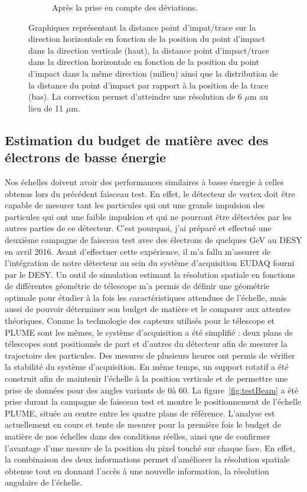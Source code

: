 \documentclass[a4papper, 10pt]{article}
\begin{document}
\begin{figure}
\begin{subfigure}[t]{0.4\textwidth}
            \caption{Après la prise en compte des déviations.}
            \label{fig:correction}
        \end{subfigure}
        \caption{Graphiques représentant la distance point d'impat/trace sur la direction horizontale en fonction de la position du point d'impact dans la direction verticale (haut), la distance point d'impact/trace dans la direction horizontale en fonction de la position du point d'impact dans la même direction (milieu) ainsi que la distribution de la distance du point d'impact par rapport à la position de la trace (bas). La correction permet d'atteindre une résolution de 6 $\mu$m au lieu de 11 $\mu$m.}
        \label{fig:defCor}
    \end{figure}    

    \subsection{Estimation du budget de matière avec des électrons de basse énergie}

  Nos échelles doivent avoir des performances similaires à basse énergie à celles obtenus lors du précédent faisceau test.
  En effet, le détecteur de vertex doit être capable de mesurer tant les particules qui ont une grande impulsion des particules qui ont une faible impulsion et qui ne pourront être détectées par les autres parties de ce détecteur.
  C'est pourquoi, j'ai préparé et effectué une deuxième campagne de faisceau test avec des électrons de quelques GeV au DESY en avril 2016.
  Avant d'effectuer cette expérience, il m'a fallu m'assurer de l'intégration de notre détecteur au sein du système d'acquisition EUDAQ fourni par le DESY. 
  Un outil de simulation estimant la résolution spatiale en fonctions de différentes géométrie de télescope m'a permis de définir une géométrie optimale pour étudier à la fois les caractéristiques attendues de l'échelle, mais aussi de pouvoir déterminer son budget de matière et le comparer aux attentes théoriques.
  Comme la technologie des capteurs utilisés pour le télescope et PLUME sont les mêmes, le système d'acquisition a été simplifié : deux plans de télescopes sont positionnés de part et d'autres du détecteur afin de mesurer la trajectoire des particules. 
  Des mesures de plusieurs heures ont permis de vérifier la stabilité du système d'acquisition. 
  En même temps, un support rotatif a été construit afin de maintenir l'échelle à la position verticale et de permettre une prise de données pour des angles variants de 0\degre à 60\degre.
  La figure~\ref{fig:testBeam} a été prise durant la campagne de faisceau test et montre le positionnement de l'échelle PLUME, située au centre entre les quatre plans de référence.
  L'analyse est actuellement en cours et tente de mesurer pour la première fois le budget de matière de nos échelles dans des conditions réelles, ainsi que de confirmer l'avantage d'une mesure de la position du pixel touché sur chaque face.
  En effet, la combinaison des deux informations permet d'améliorer la résolution spatiale obtenue tout en donnant l'accès à une nouvelle information, la résolution angulaire de l'échelle.
\end{document}
